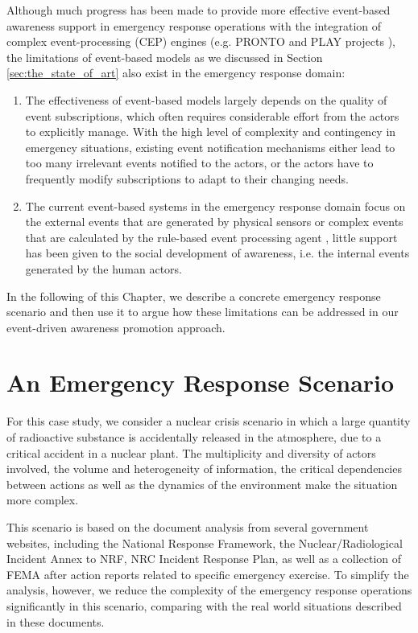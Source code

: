 Although much progress has been made to provide more effective event-based awareness support in emergency response operations with the integration of complex event-processing (CEP) engines (e.g. PRONTO \cite{Pottebaum2011} and PLAY projects \cite{Truptil2012}), the limitations of event-based models as we discussed in Section \ref{sec:the_state_of_art} also exist in the emergency response domain: 

\begin{enumerate}
	\item The effectiveness of event-based models largely depends on the quality of event subscriptions, which often requires considerable effort from the actors to explicitly manage. With the high level of complexity and contingency in emergency situations, existing event notification mechanisms either lead to too many irrelevant events notified to the actors, or the actors have to frequently modify subscriptions to adapt to their changing needs.
	\item The current event-based systems in the emergency response domain focus on the external events that are generated by physical sensors or complex events that are calculated by the rule-based event processing agent \cite{Pottebaum2011}, little support has been given to the social development of awareness, i.e. the internal events generated by the human actors.
\end{enumerate}

In the following of this Chapter, we describe a concrete emergency response scenario and then use it to argue how these limitations can be addressed in our event-driven awareness promotion approach.

\section{An Emergency Response Scenario} %
\label{sec:an_emergency_response_scenario}
For this case study, we consider a nuclear crisis scenario in which a large quantity of radioactive substance is accidentally released in the atmosphere, due to a critical accident in a nuclear plant. The multiplicity and diversity of actors involved, the volume and heterogeneity of information, the critical dependencies between actions as well as the dynamics of the environment make the situation more complex. 

This scenario is based on the document analysis from several government websites, including the National Response Framework, the Nuclear/Radiological Incident Annex to NRF, NRC Incident Response Plan, as well as a collection of FEMA after action reports related to specific emergency exercise. To simplify the analysis, however, we reduce the complexity of the emergency response operations significantly in this scenario, comparing with the real world situations described in these documents.

